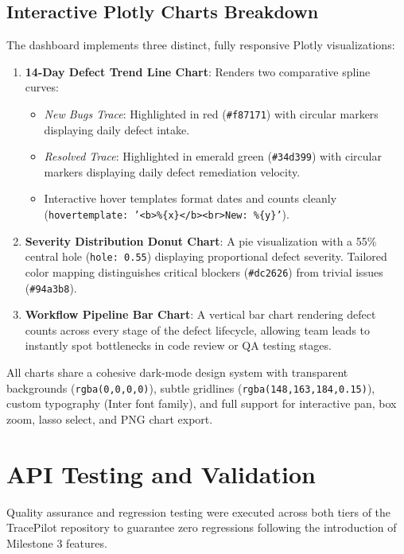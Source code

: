 \documentclass[11pt,a4paper]{article}
\begin{document}
\subsection{Interactive Plotly Charts Breakdown}
The dashboard implements three distinct, fully responsive Plotly visualizations:
\begin{enumerate}
    \item \textbf{14-Day Defect Trend Line Chart}: Renders two comparative spline curves:
    \begin{itemize}
        \item \textit{New Bugs Trace}: Highlighted in red (\texttt{\#f87171}) with circular markers displaying daily defect intake.
        \item \textit{Resolved Trace}: Highlighted in emerald green (\texttt{\#34d399}) with circular markers displaying daily defect remediation velocity.
        \item Interactive hover templates format dates and counts cleanly (\texttt{hovertemplate: '<b>\%\{x\}</b><br>New: \%\{y\}'}).
    \end{itemize}
    \item \textbf{Severity Distribution Donut Chart}: A pie visualization with a 55\% central hole (\texttt{hole: 0.55}) displaying proportional defect severity. Tailored color mapping distinguishes critical blockers (\texttt{\#dc2626}) from trivial issues (\texttt{\#94a3b8}).
    \item \textbf{Workflow Pipeline Bar Chart}: A vertical bar chart rendering defect counts across every stage of the defect lifecycle, allowing team leads to instantly spot bottlenecks in code review or QA testing stages.
\end{enumerate}

All charts share a cohesive dark-mode design system with transparent backgrounds (\texttt{rgba(0,0,0,0)}), subtle gridlines (\texttt{rgba(148,163,184,0.15)}), custom typography (Inter font family), and full support for interactive pan, box zoom, lasso select, and PNG chart export.

\section{API Testing and Validation}
Quality assurance and regression testing were executed across both tiers of the TracePilot repository to guarantee zero regressions following the introduction of Milestone 3 features.
\end{document}
